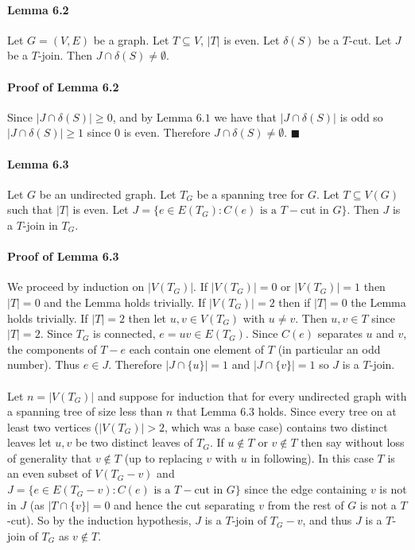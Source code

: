 \documentclass[letterpaper,12pt,oneside,onecolumn]{article}
\begin{document}
\paragraph{Lemma 6.2}
Let $G=(V,E)$ be a graph. Let $T \subseteq V$, $|T|$ is even. Let $\delta(S)$ be a $T$-cut. Let $J$ be a $T$-join. Then $J \cap \delta(S) \neq \emptyset$.
\paragraph{Proof of Lemma 6.2}
Since $|J \cap \delta(S)| \geq 0$, and by Lemma $6.1$ we have that $|J \cap \delta(S)|$ is odd so $|J \cap \delta(S)| \geq 1$ since $0$ is even. Therefore $J \cap \delta(S) \neq \emptyset$. $\blacksquare$
\paragraph{Lemma 6.3}
Let $G$ be an undirected graph. Let $T_G$ be a spanning tree for $G$. Let $T \subseteq V(G)$ such that $|T|$ is even. Let $J = \{e \in E(T_G) : C(e) \text{ is a } T-\text{cut in } G\}$. Then $J$ is a $T$-join in $T_G$.
\paragraph{Proof of Lemma 6.3}
We proceed by induction on $|V(T_G)|$. If $|V(T_G)| = 0$ or $|V(T_G)| = 1$ then $|T| = 0$ and the Lemma holds trivially. If $|V(T_G)| = 2$ then if $|T| = 0$ the Lemma holds trivially. If $|T|=2$ then let $u,v \in V(T_G)$ with $u\neq v$. Then $u,v\in T$ since $|T| = 2$. Since $T_G$ is connected, $e=uv \in E(T_G)$. Since $C(e)$ separates $u$ and $v$, the components of $T-e$ each contain one element of $T$ (in particular an odd number). Thus $e \in J$. Therefore $|J \cap \{u\}| = 1$ and $|J \cap \{v\}| = 1$ so $J$ is a $T$-join.
\paragraph{}
Let $n = |V(T_G)|$ and suppose for induction that for every undirected graph with a spanning tree of size less than $n$ that Lemma $6.3$ holds. Since every tree on at least two vertices ($|V(T_G)| > 2$, which was a base case) contains two distinct leaves let $u,v$ be two distinct  leaves of $T_G$. If $u \not\in T$ or $v \not\in T$ then say without loss of generality that $v \not\in T$ (up to replacing $v$ with $u$ in following). In this case $T$ is an even subset of $V(T_G-v)$ and $J = \{e \in E(T_G-v) : C(e) \text{ is a } T-\text{cut in } G\}$ since the edge containing $v$ is not in $J$ (as $|T \cap \{v\}| = 0$ and hence the cut separating $v$ from the rest of $G$ is not a $T$-cut). So by the induction hypothesis, $J$ is a $T$-join of $T_G - v$, and thus $J$ is a $T$-join of $T_G$ as $v \not\in T$.
\end{document}
